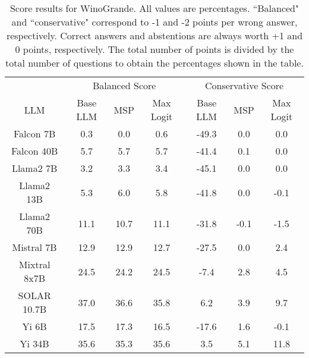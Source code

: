 \begin{table*}
\centering
\begin{tabular}{c|c|c|c|c|c|c}
& \multicolumn{3}{c|}{Balanced Score} & \multicolumn{3}{c}{Conservative Score} \\ 
LLM & Base LLM & MSP & Max Logit & Base LLM & MSP & Max Logit\\ \hline
Falcon 7B & 0.3 & 0.0 & 0.6 & -49.3 & 0.0 & 0.0\\
Falcon 40B & 5.7 & 5.7 & 5.7 & -41.4 & 0.1 & 0.0\\
Llama2 7B & 3.2 & 3.3 & 3.4 & -45.1 & 0.0 & 0.0\\
Llama2 13B & 5.3 & 6.0 & 5.8 & -41.8 & 0.0 & -0.1\\
Llama2 70B & 11.1 & 10.7 & 11.1 & -31.8 & -0.1 & -1.5\\
Mistral 7B & 12.9 & 12.9 & 12.7 & -27.5 & 0.0 & 2.4\\
Mixtral 8x7B & 24.5 & 24.2 & 24.5 & -7.4 & 2.8 & 4.5\\
SOLAR 10.7B & 37.0 & 36.6 & 35.8 & 6.2 & 3.9 & 9.7\\
Yi 6B & 17.5 & 17.3 & 16.5 & -17.6 & 1.6 & -0.1\\
Yi 34B & 35.6 & 35.3 & 35.6 & 3.5 & 5.1 & 11.8\\
\hline
\end{tabular}
\caption{Score results for WinoGrande. All values are percentages. ``Balanced" and ``conservative" correspond to -1 and -2 points per wrong answer, respectively. Correct answers and abstentions are always worth +1 and 0 points, respectively. The total number of points is divided by the total number of questions to obtain the percentages shown in the table.}
\label{tab:winogrande_score}
\end{table*}

